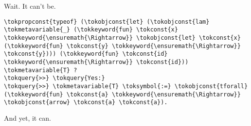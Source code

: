 \importantCodeblockEnd{}

\heroSTUDENT{} Wait. It can't be.

\begin{verbatim}
\tokpropconst{typeof} (\tokobjconst{let} (\tokobjconst{lam} \tokmetavariable{_} (\tokkeyword{fun} \tokconst{x} \tokkeyword{\ensuremath{\Rightarrow}} \tokobjconst{let} \tokconst{x} (\tokkeyword{fun} \tokconst{y} \tokkeyword{\ensuremath{\Rightarrow}} \tokconst{y}))) (\tokkeyword{fun} \tokconst{id} \tokkeyword{\ensuremath{\Rightarrow}} \tokconst{id})) \tokmetavariable{T} ?
\tokquery{>>} \tokquery{Yes:}
\tokquery{>>} \tokmetavariable{T} \toksymbol{:=} \tokobjconst{tforall} (\tokkeyword{fun} \tokconst{a} \tokkeyword{\ensuremath{\Rightarrow}} \tokobjconst{arrow} \tokconst{a} \tokconst{a}).
\end{verbatim}

\heroADVISOR{} And yet, it can.
